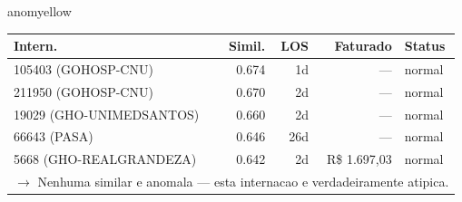 \documentclass[a4paper,10pt]{article}
\begin{document}
\begin{anomalycard}[Internacao 167361 | GHO-PETROBRAS | MODERADO (z=2.27)]{anomyellow}
\begin{tabular}{l r r r l}\toprule\textbf{Intern.} & \textbf{Simil.} & \textbf{LOS} & \textbf{Faturado} & \textbf{Status} \\\midrule
105403 (GOHOSP-CNU) & 0.674 & 1d & --- & \textcolor{jcubeblue}{normal} \\
211950 (GOHOSP-CNU) & 0.670 & 2d & --- & \textcolor{jcubeblue}{normal} \\
19029 (GHO-UNIMEDSANTOS) & 0.660 & 2d & --- & \textcolor{jcubeblue}{normal} \\
66643 (PASA) & 0.646 & 26d & --- & \textcolor{jcubeblue}{normal} \\
5668 (GHO-REALGRANDEZA) & 0.642 & 2d & R\$ 1.697,03 & \textcolor{jcubeblue}{normal} \\
\multicolumn{5}{l}{\textcolor{jcubeblue}{\small $\rightarrow$ Nenhuma similar e anomala --- esta internacao e verdadeiramente atipica.}} \\
\bottomrule\end{tabular}


\end{anomalycard}

\newpage
\end{document}
